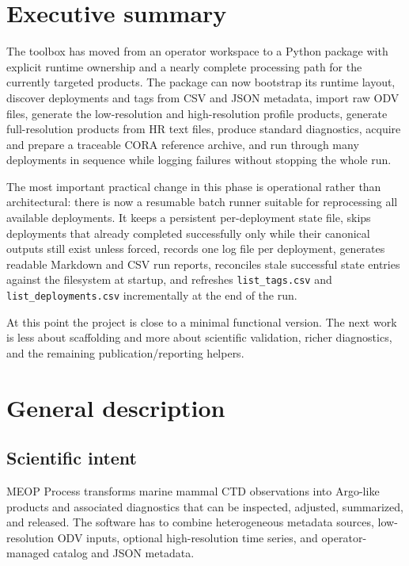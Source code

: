 \documentclass[11pt,a4paper]{article}
\newcommand{\pkg}[1]{\texttt{#1}}
\begin{document}
\tableofcontents
\newpage

\section{Executive summary}

The toolbox has moved from an operator workspace to a Python package with explicit runtime ownership and a nearly complete processing path for the currently targeted products. The package can now bootstrap its runtime layout, discover deployments and tags from CSV and JSON metadata, import raw ODV files, generate the low-resolution and high-resolution profile products, generate full-resolution products from HR text files, produce standard diagnostics, acquire and prepare a traceable CORA reference archive, and run through many deployments in sequence while logging failures without stopping the whole run.

The most important practical change in this phase is operational rather than architectural: there is now a resumable batch runner suitable for reprocessing all available deployments. It keeps a persistent per-deployment state file, skips deployments that already completed successfully only while their canonical outputs still exist unless forced, records one log file per deployment, generates readable Markdown and CSV run reports, reconciles stale successful state entries against the filesystem at startup, and refreshes \pkg{list\_tags.csv} and \pkg{list\_deployments.csv} incrementally at the end of the run.

At this point the project is close to a minimal functional version. The next work is less about scaffolding and more about scientific validation, richer diagnostics, and the remaining publication/reporting helpers.

\section{General description}

\subsection{Scientific intent}

MEOP Process transforms marine mammal CTD observations into Argo-like products and associated diagnostics that can be inspected, adjusted, summarized, and released. The software has to combine heterogeneous metadata sources, low-resolution ODV inputs, optional high-resolution time series, and operator-managed catalog and JSON metadata.
\end{document}
